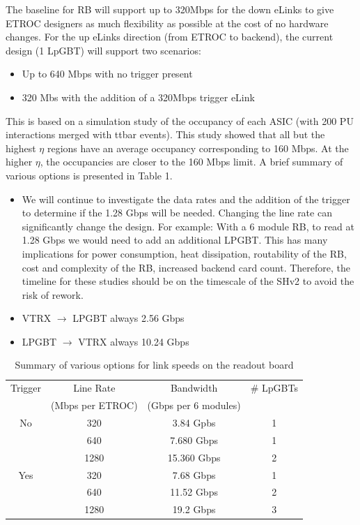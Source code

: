 \documentclass[11pt]{article}
\begin{document}
The baseline for RB will support up to 320Mbps for the down eLinks to give ETROC designers as much flexibility as possible at the cost of no hardware changes. For the up eLinks direction (from ETROC to backend), the current design (1 LpGBT) will support two scenarios:

\begin{itemize}
  \item Up to 640 Mbps with no trigger present
  \item 320 Mbs with the addition of a 320Mbps trigger eLink
\end{itemize}

This is based on a simulation study of the occupancy of each ASIC (with 200 PU interactions merged with ttbar events). This study showed that all but the highest $\eta$ regions have an average occupancy corresponding to 160 Mbps. At the higher $\eta$, the occupancies are closer to the 160 Mbps limit. A brief summary of various options is presented in Table 1.

\begin{itemize}
  \item We will continue to investigate the data rates and the addition of the trigger to determine if the 1.28 Gbps will be needed. Changing the line rate can significantly change the design. For example: With a 6 module RB, to read at 1.28 Gbps we would need to add an additional LPGBT. This has many implications for power consumption, heat dissipation, routability of the RB, cost and complexity of the RB, increased backend card count. Therefore, the timeline for these studies should be on the timescale of the SHv2 to avoid the risk of rework.
  \item VTRX $\rightarrow$ LPGBT always 2.56 Gbps
  \item LPGBT $\rightarrow$ VTRX always 10.24 Gbps
\end{itemize}

\begin{table}
  \centering
  \begin{tabular}{ c c c c }
    Trigger & Line Rate        & Bandwidth            & \# LpGBTs \\
            & (Mbps per ETROC) & (Gbps per 6 modules) &           \\
    \midrule
    No      & 320              & 3.84 Gpbs            & 1         \\
            & 640              & 7.680 Gbps           & 1         \\
            & 1280             & 15.360 Gbps          & 2         \\
    Yes     & 320              & 7.68 Gbps            & 1         \\
            & 640              & 11.52 Gbps           & 2         \\
            & 1280             & 19.2 Gbps            & 3         \\
  \end{tabular}
  \caption{Summary of various options for link speeds on the readout board}
\end{table}
\end{document}
